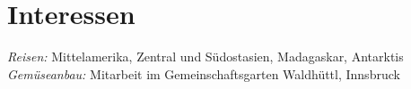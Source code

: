 \documentclass[a4paper]{twentysecondcv} %
\begin{document}



\vspace*{0.7em}



\section{Interessen}

\emph{Reisen: } Mittelamerika, Zentral und S\"udostasien, Madagaskar, Antarktis\\
\emph{Gem\"useanbau: } Mitarbeit im Gemeinschaftsgarten Waldh\"uttl, Innsbruck\
\end{document}
